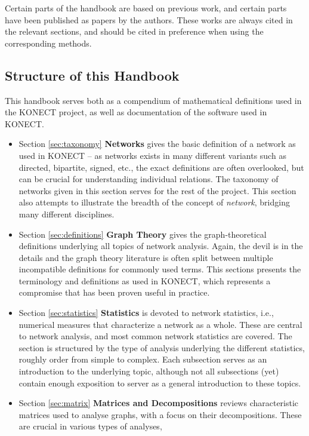 \documentclass{article}
\begin{document}
Certain parts of the handbook are based on previous work, and certain
parts have been published as papers by the authors.  These works are
always cited in the relevant sections, and should be cited in preference
when using the corresponding methods. 

\subsection{Structure of this Handbook}
This handbook serves both as a compendium of mathematical definitions
used in the KONECT project, as well as documentation of the software
used in KONECT. 
\begin{itemize}
\item Section \ref{sec:taxonomy} \textbf{Networks} gives the basic
  definition of a network as used in KONECT -- as networks exists in
  many different variants such as directed, bipartite, signed, etc., the
  exact definitions are often overlooked, but can be crucial for
  understanding individual relations. The taxonomy of networks given in
  this section serves for the rest of the project.  This section also
  attempts to illustrate the breadth of the concept of \emph{network},
  bridging many different disciplines. 
\item Section \ref{sec:definitions} \textbf{Graph Theory} gives the
  graph-theoretical definitions underlying all topics of network analysis.  Again,
  the devil is in the details and the graph theory literature is often
  split between multiple incompatible definitions for commonly used
  terms.  This sections presents the terminology and definitions as used
  in KONECT, which represents a compromise that has been proven useful
  in practice. 
\item Section \ref{sec:statistics} \textbf{Statistics} is devoted to
  network statistics, i.e., numerical measures that characterize a
  network as a whole.  These are central to network analysis, and most
  common network statistics are covered.  The section is structured by
  the type of analysis underlying the different statistics, roughly
  order from simple to complex.  Each subsection serves as an
  introduction to the underlying topic, although not all subsections
  (yet) contain enough exposition to server as a general introduction to
  these topics. 
\item Section \ref{sec:matrix} \textbf{Matrices and Decompositions} reviews
  characteristic matrices used to analyse graphs, with a focus on their
  decompositions.  These are crucial in various types of analyses,

\end{itemize}
\end{document}
